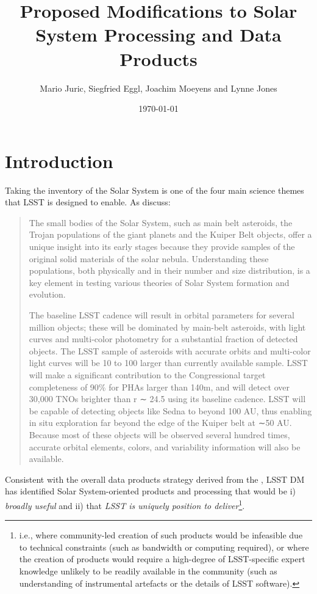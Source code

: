 \documentclass[DM,authoryear,toc,lsstdraft]{lsstdoc}
\title[Solar System Data Products Changes]{Proposed Modifications to Solar System Processing and Data Products}
\author{%
Mario Juric,
Siegfried Eggl,
Joachim Moeyens
and Lynne Jones
}
\date{\today}
\begin{document}
\maketitle


\section{Introduction}

Taking the inventory of the Solar System is one of the four main science themes that LSST is designed to enable. As \cite{2008arXiv0805.2366I} discuss:

\begin{quotation}
The small bodies of the Solar System, such as main belt
asteroids, the Trojan populations of the giant planets
and the Kuiper Belt objects, offer a unique insight
into its early stages because they provide samples of
the original solid materials of the solar nebula. Understanding
these populations, both physically and in their
number and size distribution, is a key element in testing
various theories of Solar System formation and evolution.

The baseline LSST cadence will result in orbital parameters
for several million objects; these will be dominated
by main-belt asteroids, with light curves and
multi-color photometry for a substantial fraction of detected
objects. The LSST sample of asteroids with accurate
orbits and multi-color light curves will be 10 to
100 larger than currently available sample. LSST will
make a significant contribution to the Congressional target
completeness of 90\% for PHAs larger than 140m, and will 
detect over 30,000 TNOs brighter than r ∼ 24.5 using 
its baseline cadence. LSST will be capable
of detecting objects like Sedna to beyond 100 AU,
thus enabling in situ exploration far beyond the edge of
the Kuiper belt at ∼50 AU. Because most of these objects
will be observed several hundred times, accurate
orbital elements, colors, and variability information will
also be available.
\end{quotation}

Consistent with the overall data products strategy derived from the ,
LSST DM has identified Solar System-oriented products and 
processing that would be i) {\em broadly useful} and ii) that 
{\em LSST is uniquely position to deliver}\footnote{i.e., where community-led
creation of such products would be infeasible due to technical
constraints (such as bandwidth or computing required), or where
the creation of products would require a high-degree of LSST-specific
expert knowledge unlikely to be readily available in the community
(such as understanding of instrumental artefacts or the details of
LSST software).}.
\end{document}
